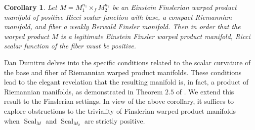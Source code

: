 \documentclass[pdflatex,sn-mathphys-num]{sn-jnl}%
\newtheorem{corollary}{Corollary}[section]
\theoremstyle{thmstyleone}%
\theoremstyle{thmstyletwo}%
\theoremstyle{thmstylethree}%
\begin{document}
\begin{corollary}\label{rn}
Let $M=M_1^{n_1}\times_{f} M_2^{n_2}$ be an Einstein Finslerian warped product manifold of positive Ricci scalar function with base, a compact Riemannian manifold, and fiber a weakly Berwald Finsler manifold. Then in order that the warped product $M$ is a legitimate  Einstein Finsler warped product manifold, Ricci scalar function of the fiber must be positive.
\end{corollary}
 
\bigskip
 
 Dan Dumitru delves into the specific conditions related to the scalar curvature of the base and fiber of Riemannian warped product manifolds. These conditions lead to the elegant revelation that the resulting manifold is, in fact, a product of Riemannian manifolds, as demonstrated in Theorem $2.5$ of \cite{dam}. We extend this result to the  Finslerian settings.
 In view of the above corollary, it suffices to explore obstructions to the triviality of Finslerian warped product manifolds when $\operatorname{Scal}_M$ and $\operatorname{Scal}_{M_2}$ are strictly positive.


\bigskip
\end{document}
